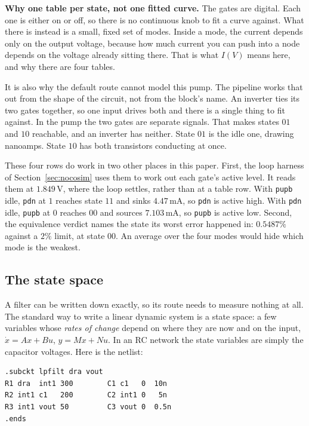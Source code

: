 \documentclass[11pt,a4paper]{article}
\newcommand{\unit}[1]{\,\textrm{#1}}
\begin{document}
\noindent \textbf{Why one table per state, not one fitted curve.} The
gates are digital. Each one is either on or off, so there is no
continuous knob to fit a curve against. What there is instead is a
small, fixed set of modes. Inside a mode, the current depends only on
the output voltage, because how much current you can push into a node
depends on the voltage already sitting there. That is what $I(V)$
means here, and why there are four tables.

It is also why the default route cannot model this pump. The pipeline
works that out from the shape of the circuit, not from the block's
name. An inverter ties its two gates together, so one input drives
both and there is a single thing to fit against. In the pump the two
gates are separate signals. That makes states $01$ and $10$ reachable,
and an inverter has neither. State $01$ is the idle one, drawing
nanoamps. State $10$ has both transistors conducting at once.

These four rows do work in two other places in this paper. First, the
loop harness of Section~\ref{sec:nocosim} uses them to work out each
gate's active level. It reads them at $1.849\unit{V}$, where the loop
settles, rather than at a table row. With \texttt{pupb} idle,
\texttt{pdn} at $1$ reaches state $11$ and sinks $4.47\unit{mA}$, so
\texttt{pdn} is active high. With \texttt{pdn} idle, \texttt{pupb} at
$0$ reaches $00$ and sources $7.103\unit{mA}$, so \texttt{pupb} is
active low. Second, the equivalence verdict names the state its worst
error happened in: $0.5487\%$ against a $2\%$ limit, at state $00$. An
average over the four modes would hide which mode is the weakest.

\subsection{The state space}

\noindent A filter can be written down exactly, so its route needs to
measure nothing at all. The standard way to write a linear dynamic
system is a state space: a few variables whose \emph{rates of change}
depend on where they are now and on the input, $\dot{x} = Ax + Bu$,
$y = Mx + Nu$. In an RC network the state variables are simply the
capacitor voltages. Here is the netlist:

\begin{lstlisting}
.subckt lpfilt dra vout
R1 dra  int1 300        C1 c1   0  10n
R2 int1 c1   200        C2 int1 0   5n
R3 int1 vout 50         C3 vout 0  0.5n
.ends
\end{lstlisting}
\end{document}
